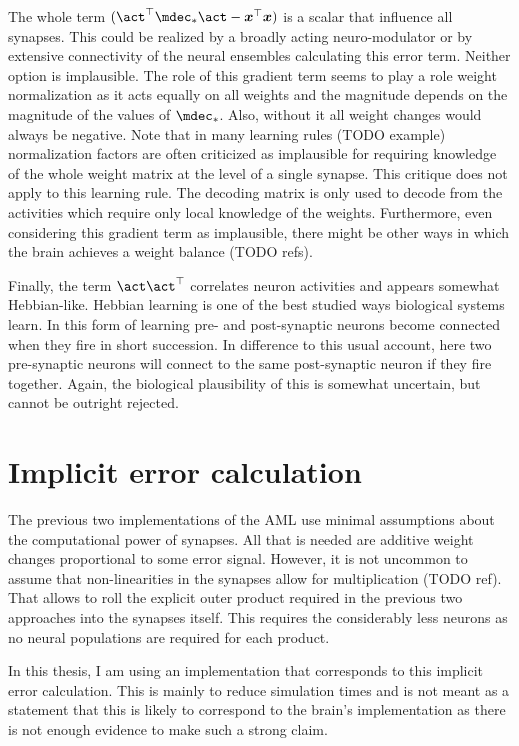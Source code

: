 The whole term $(\vc\act\Tr \mdec_* \vc\act - \vc x\Tr \vc x)$ is a scalar that influence all synapses.
This could be realized by a broadly acting neuro-modulator or by extensive connectivity of the neural ensembles calculating this error term.
Neither option is implausible.
The role of this gradient term seems to play a role weight normalization as it acts equally on all weights and the magnitude depends on the magnitude of the values of $\mdec_*$.
Also, without it all weight changes would always be negative.
Note that in many learning rules (TODO example) normalization factors are often criticized as implausible for requiring knowledge of the whole weight matrix at the level of a single synapse.
This critique does not apply to this learning rule.
The decoding matrix is only used to decode from the activities which require only local knowledge of the weights.
Furthermore, even considering this gradient term as implausible, there might be other ways in which the brain achieves a weight balance (TODO refs).

Finally, the term $\vc\act \vc\act\Tr$ correlates neuron activities and appears somewhat Hebbian-like.
Hebbian learning is one of the best studied ways biological systems learn.
In this form of learning pre- and post-synaptic neurons become connected when they fire in short succession.
In difference to this usual account, here two pre-synaptic neurons will connect to the same post-synaptic neuron if they fire together.
Again, the biological plausibility of this is somewhat uncertain, but cannot be outright rejected.


\section{Implicit error calculation}
The previous two implementations of the AML use minimal assumptions about the computational power of synapses.
All that is needed are additive weight changes proportional to some error signal.
However, it is not uncommon to assume that non-linearities in the synapses allow for multiplication (TODO ref).
That allows to roll the explicit outer product required in the previous two approaches into the synapses itself.
This requires the considerably less neurons as no neural populations are required for each product.

In this thesis, I am using an implementation that corresponds to this implicit error calculation.
This is mainly to reduce simulation times and is not meant as a statement that this is likely to correspond to the brain's implementation as there is not enough evidence to make such a strong claim.


